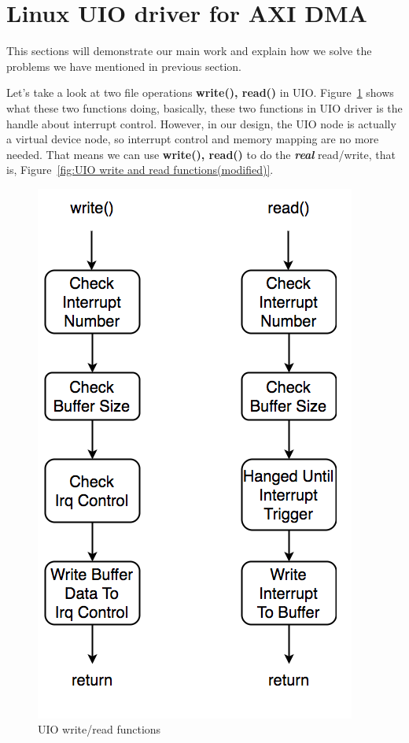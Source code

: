 \section{Linux UIO driver for AXI DMA}
\label{sec:Linux UIO driver for AXI DMA}
This sections will demonstrate our main work and explain how we solve the problems we have mentioned in previous section.

Let's take a look at two file operations \textbf{write(), read()} in UIO. Figure~\ref{fig:UIO write and read functions.} shows what these two functions doing, basically, these two functions in UIO driver is the handle about interrupt control. However, in our design, the UIO node is actually a virtual device node, so interrupt control and memory mapping are no more needed. That means we can use \textbf{write(), read()} to do the \emph{\textbf{real}} read/write, that is, Figure~\ref{fig:UIO write and read functions(modified)}. 

\begin{figure}[!htb]
  \centering
  \includegraphics[scale=0.5]{images/uio_func_write.png}
  \caption[UIO write/read functions.]{UIO write/read functions}
  \label{fig:UIO write and read functions.}
\end{figure}

